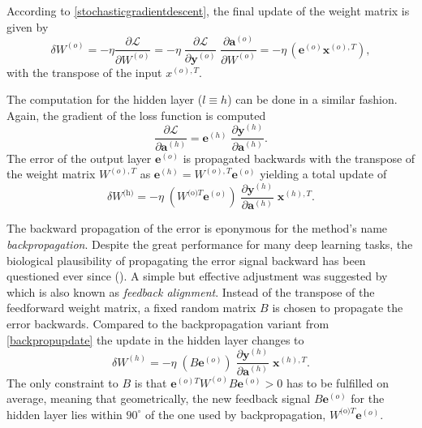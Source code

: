 According to \cref{stochasticgradientdescent}, the final update of the weight matrix is given by
\begin{equation}
\delta W^{(o)} = - \eta \frac{\partial \mathcal{L}}{\partial W^{(o)}} 
= - \eta \;
\frac{\partial\mathcal{L}}{\partial \mathbf{y}^{(o)}} \;
\frac{\partial \mathbf{a}^{(o)}}{\partial W^{(o)}}
= - \eta \, \left(\mathbf{e}^{(o)} \mathbf{x}^{(o),T}\right),
\label{backpropupdate}
\end{equation}
with the transpose of the input $x^{(o),T}$.

The computation for the hidden layer ($l\equiv h$) can be done in a similar fashion. Again, the gradient of the loss function is computed
\begin{equation*}
\frac{\partial\mathcal{L}}{\partial \mathbf{a}^{(h)}} = \mathbf{e}^{(h)} \;
\frac{\partial \mathbf{y}^{(h)} }{\partial \mathbf{a}^{(h)}}.
\end{equation*}
The error of the output layer $\mathbf{e}^{(o)}$ is propagated backwards with the transpose of the weight matrix $W^{(o),T}$ as $\mathbf{e}^{(h)}=W^{(o),T}\mathbf{e}^{(o)}$ yielding a total update of
\begin{equation*}
\delta W^{\text{(h)}} = - \eta \;
\left(W^{\text{(o)}T} \mathbf{e}^{(o)}\right) \;
\frac{\partial \mathbf{y}^{(h)} }{\partial \mathbf{a}^{(h)}} \; \mathbf{x}^{(h), T}.
\end{equation*}

The backward propagation of the error is eponymous for the method's name \textit{backpropagation}. Despite the great performance for many deep learning tasks, the biological plausibility of propagating the error signal backward has been questioned ever since (\citealp{grossberg1987competitive}). A simple but effective adjustment was suggested by \cite{lillicrap2016random} which is also known as \textit{feedback alignment}. Instead of the transpose of the feedforward weight matrix, a fixed random matrix $B$ is chosen to propagate the error backwards. Compared to the backpropagation variant from \cref{backpropupdate} the update in the hidden layer changes to
\begin{equation*}
\delta W^{(h)} = - \eta \;
(B \mathbf{e}^{(o)}) \;
\frac{\partial \mathbf{y}^{(h)}}{\partial \mathbf{a}^{(h)}} \;
\mathbf{x}^{(h),T}.
\end{equation*}
The only constraint to $B$ is that $\mathbf{e}^{(o)T} W^{(o)} B \mathbf{e}^{(o)} > 0$ has to be fulfilled on average, meaning that geometrically, the new feedback signal $B \mathbf{e}^{(o)}$ for the hidden layer lies within $90^{\circ}$ of the one used by backpropagation, $W^{\text{(o)}T} \mathbf{e}^{(o)}$.

